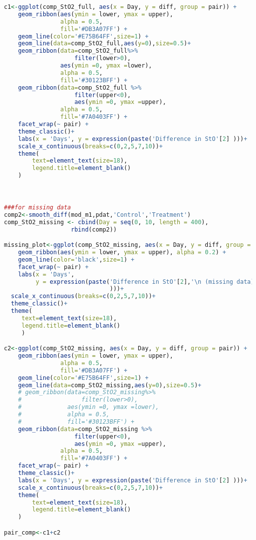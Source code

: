 \documentclass[
]{article}
\begin{document}
\begin{lstlisting}[language=R]
c1<-ggplot(comp_StO2_full, aes(x = Day, y = diff, group = pair)) +
    geom_ribbon(aes(ymin = lower, ymax = upper),
                alpha = 0.5,
                fill='#DB3A07FF') +
    geom_line(color='#E75B64FF',size=1) +
    geom_line(data=comp_StO2_full,aes(y=0),size=0.5)+
    geom_ribbon(data=comp_StO2_full%>%
                    filter(lower>0),
                aes(ymin =0, ymax =lower),
                alpha = 0.5,
                fill='#30123BFF') +
    geom_ribbon(data=comp_StO2_full %>%
                    filter(upper<0),
                    aes(ymin =0, ymax =upper),
                alpha = 0.5,
                fill='#7A0403FF') +
    facet_wrap(~ pair) +
    theme_classic()+
    labs(x = 'Days', y = expression(paste('Difference in StO'[2] )))+
    scale_x_continuous(breaks=c(0,2,5,7,10))+
    theme(
        text=element_text(size=18),
        legend.title=element_blank()
    )



###for missing data
comp2<-smooth_diff(mod_m1,pdat,'Control','Treatment')
comp_StO2_missing <- cbind(Day = seq(0, 10, length = 400),
                   rbind(comp2))

missing_plot<-ggplot(comp_StO2_missing, aes(x = Day, y = diff, group = pair)) +
    geom_ribbon(aes(ymin = lower, ymax = upper), alpha = 0.2) +
    geom_line(color='black',size=1) +
    facet_wrap(~ pair) +
    labs(x = 'Days', 
         y = expression(paste('Difference in StO'[2],'\n (missing data)' 
                              )))+
  scale_x_continuous(breaks=c(0,2,5,7,10))+
  theme_classic()+
  theme(
     text=element_text(size=18),
     legend.title=element_blank()
     )

c2<-ggplot(comp_StO2_missing, aes(x = Day, y = diff, group = pair)) +
    geom_ribbon(aes(ymin = lower, ymax = upper),
                alpha = 0.5,
                fill='#DB3A07FF') +
    geom_line(color='#E75B64FF',size=1) +
    geom_line(data=comp_StO2_missing,aes(y=0),size=0.5)+
    # geom_ribbon(data=comp_StO2_missing%>%
    #                 filter(lower>0),
    #             aes(ymin =0, ymax =lower),
    #             alpha = 0.5,
    #             fill='#30123BFF') +
    geom_ribbon(data=comp_StO2_missing %>%
                    filter(upper<0),
                    aes(ymin =0, ymax =upper),
                alpha = 0.5,
                fill='#7A0403FF') +
    facet_wrap(~ pair) +
    theme_classic()+
    labs(x = 'Days', y = expression(paste('Difference in StO'[2] )))+
    scale_x_continuous(breaks=c(0,2,5,7,10))+
    theme(
        text=element_text(size=18),
        legend.title=element_blank()
    )

pair_comp<-c1+c2
\end{lstlisting}
\end{document}
